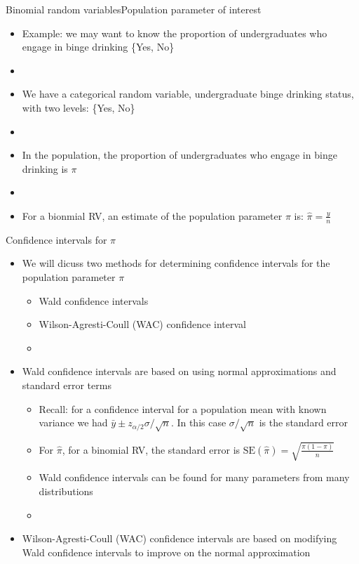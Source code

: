 \documentclass[xcolor=dvipsnames]{beamer}
\begin{document}
\begin{frame}{Binomial random variables}{Population parameter of interest}
	\begin{itemize}
		\item Example: we may want to know the proportion of undergraduates who engage in binge drinking \{Yes, No\} \pause
		\item[]
		\item We have a categorical random variable, undergraduate binge drinking status, with two levels: \{Yes, No\} \pause
		\item[]
		\item In the population, the proportion of undergraduates who engage in binge drinking is $\pi$ \pause
		\item[]
		\item For a bionmial RV, an estimate of the population parameter $\pi$ is: $\hat{\pi} = \frac{y}{n}$
	\end{itemize}
\end{frame}

\begin{frame}{Confidence intervals for $\pi$}
	\begin{itemize}
		\item We will dicuss two methods for determining confidence intervals for the population parameter $\pi$ \pause
		\begin{itemize}
			\item Wald confidence intervals \pause
			\item Wilson-Agresti-Coull (WAC) confidence interval \pause
			\item[]
		\end{itemize}
		
		\item Wald confidence intervals are based on using normal approximations and standard error terms \pause
		\begin{itemize}
			\item Recall: for a confidence interval for a population mean with known variance we had $\bar{y} \pm z_{\alpha / 2} \sigma / \sqrt{n}$. In this case $\sigma / \sqrt{n}$ is the standard error
			\item For $\hat{\pi}$, for a binomial RV, the standard error is $\text{SE}(\hat{\pi}) = \sqrt{\frac{\pi(1-\pi)}{n}}$ \pause
			\item Wald confidence intervals can be found for many parameters from many distributions
			\item[]
		\end{itemize}
	
		\item Wilson-Agresti-Coull (WAC) confidence intervals are based on modifying Wald confidence intervals to improve on the normal approximation \pause
	\end{itemize}
\end{frame}
\end{document}
